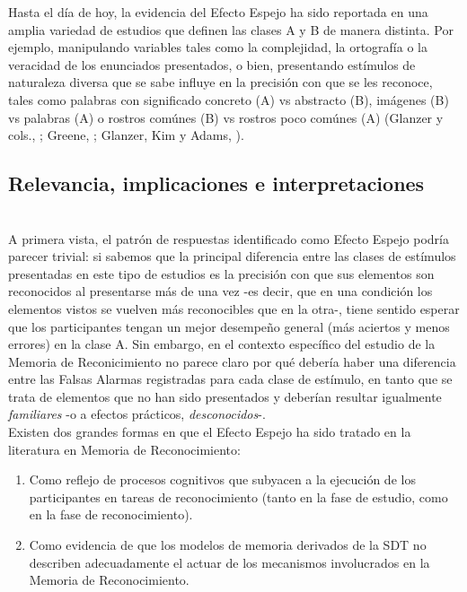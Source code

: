 Hasta el día de hoy, la evidencia del Efecto Espejo ha sido reportada en una amplia variedad de estudios que definen las clases A y B de manera distinta. Por ejemplo, manipulando variables tales como la complejidad, la ortografía o la veracidad de los enunciados presentados, o bien, presentando estímulos de naturaleza diversa que se sabe influye en la precisión con que se les reconoce, tales como palabras con significado concreto (A) vs abstracto (B), imágenes (B) vs palabras (A) o rostros comúnes (B) vs rostros poco comúnes (A) (Glanzer y cols., \citeyear{Glanzer1993}; Greene, \citeyear{Greene1996}; Glanzer, Kim y Adams, \citeyear{Glanzer1998}).\\

\subsection{Relevancia, implicaciones e interpretaciones}\\

A primera vista, el patrón de respuestas identificado como Efecto Espejo podría parecer trivial: si sabemos que la principal diferencia entre las clases de estímulos presentadas en este tipo de estudios es la precisión con que sus elementos son reconocidos al presentarse más de una vez -es decir, que en una condición los elementos vistos se vuelven más reconocibles que en la otra-, tiene sentido esperar que los participantes tengan un mejor desempeño general (más aciertos y menos errores) en la clase A. Sin embargo, en el contexto específico del estudio de la Memoria de Reconicimiento no parece claro por qué debería haber una diferencia entre las Falsas Alarmas registradas para cada clase de estímulo, en tanto que se trata de elementos que no han sido presentados y deberían resultar igualmente \textit{familiares} -o a efectos prácticos, \textit{desconocidos}-.\\

Existen dos grandes formas en que el Efecto Espejo ha sido tratado en la literatura en Memoria de Reconocimiento:\\

\begin{enumerate}
\item Como reflejo de procesos cognitivos que subyacen a la ejecución de los participantes en tareas de reconocimiento (tanto en la fase de estudio, como en la fase de reconocimiento).\\

\item Como evidencia de que los modelos de memoria derivados de la SDT no describen adecuadamente el actuar de los mecanismos involucrados en la Memoria de Reconocimiento.\\
\end{enumerate}

